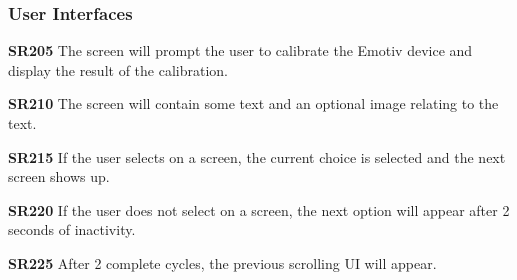 \documentclass{article}
\begin{document}
\subsubsection{User Interfaces}
\textbf{SR205} The screen will prompt the user to calibrate the Emotiv device and display the result of the calibration.

\textbf{SR210} The screen will contain some text and an optional image relating to the text.

\textbf{SR215} If the user selects on a screen, the current choice is selected and the next screen shows up. 

\textbf{SR220} If the user does not select on a screen, the next option will appear after 2 seconds of inactivity. 

\textbf{SR225} After 2 complete cycles, the previous scrolling UI will appear.




\end{document}
